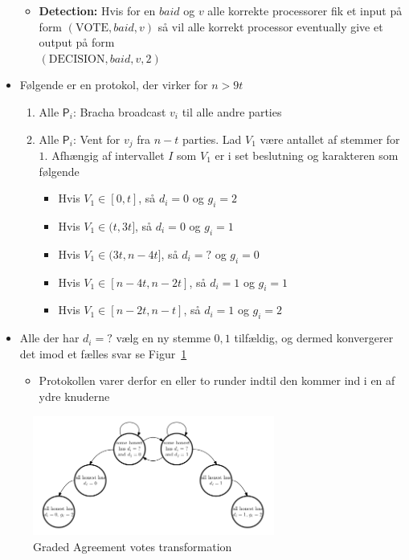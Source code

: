 \documentclass[a4, english]{article}
\begin{document}
\begin{itemize}
\begin{itemize}
    \item \textbf{Detection:} Hvis for en $baid$ og $v$ alle korrekte processorer fik et input på form $(\text{VOTE}, baid, v)$ så vil alle korrekt processor eventually give et output på form \\ $(\text{DECISION}, baid, v, 2)$ 
  \end{itemize}
  \item Følgende er en protokol, der virker for $n > 9t$
  \begin{enumerate}
  	\item Alle $\mathsf P_i$: Bracha broadcast $v_i$ til alle andre parties 
  	\item Alle $\mathsf P_i$: Vent for $v_j$ fra $n-t$ parties. Lad $V_1$ være antallet af stemmer for $1$. Afhængig af intervallet $I$ som $V_1$ er i set beslutning og karakteren som følgende   
    \begin{itemize}
    	\item Hvis $V_1 \in [0,t]$, så $d_i=0$ og $g_i = 2$ 
    	\item Hvis $V_1 \in (t,3t]$, så $d_i=0$ og $g_i = 1$ 
    	\item Hvis $V_1 \in (3t,n-4t]$, så $d_i=?$ og $g_i = 0$ 
    	\item Hvis $V_1 \in [n-4t,n-2t]$, så $d_i=1$ og $g_i = 1$ 
    	\item Hvis $V_1 \in [n-2t,n-t]$, så $d_i=1$ og $g_i = 2$ 
    \end{itemize}
  \end{enumerate}
  \item Alle der har $d_i = ?$ vælg en ny stemme $0,1$ tilfældig, og dermed konvergerer det imod et fælles svar se Figur~\ref{grade_diagram}
  \begin{itemize}
  	\item Protokollen varer derfor en eller to runder indtil den kommer ind i en af ydre knuderne  
  \end{itemize}
\end{itemize} 
\begin{figure}[h]
	\centering
	\includegraphics[width=300px]{img/grade_diagram}
	\caption{Graded Agreement votes transformation\label{grade_diagram}}
\end{figure}
\end{document}

